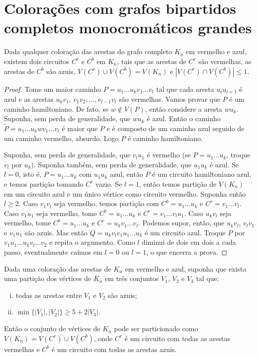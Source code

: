 \section{Colorações com grafos bipartidos completos monocromáticos grandes}

\begin{lema}
	\label{lema:gyarfas}
	Dada qualquer coloração das arestas do grafo completo $K_n$ em vermelho e azul, existem dois circuitos $C^r$ e $C^b$ em $K_n$, tais que as arestas de $C^r$ são vermelhas, as arestas de $C^b$ são azuis, $V(C^r)\cup V(C^b) = V(K_n)$ e $|V(C^r)\cap V(C^b)|\leq1$.
\end{lema}

\begin{proof}
	Tome um maior caminho $P = u_1\dots u_kv_1\dots v_l$ tal que cada aresta $u_iu_{i+1}$ é azul e as arestas $u_kv_1$, $v_1v_2, \dots, v_{l-1}v_l$ são vermelhas. Vamos provar que $P$ é um caminho hamiltoniano. De fato, se $w\notin V(P)$, então considere a aresta $wu_k$. Suponha, sem perda de generalidade, que $wu_k$ é azul. Então o caminho $\tilde{P} = u_1\dots u_k w v_1\dots v_l$ é maior que $P$ e é composto de um caminho azul seguido de um caminho vermelho, absurdo. Logo $P$ é caminho hamiltoniano. 
	
	Suponha, sem perda de generalidade, que $v_lu_1$ é vermelho (se $P = u_1\dots u_k$, troque $v_l$ por $u_k$). Suponha também, sem perda de generalidade, que $u_1u_k$ é azul. Se $l=0$, isto é, $P=u_1\dots u_k$ com $u_1u_k$ azul, então $P$ é um circuito hamiltoniano azul, e temos partição tomando $C^r$ vazio. Se $l=1$, então temos partição de $V(K_n)$ em um circuito azul e um único vértice como circuito vermelho. Suponha então $l\geq2$. Caso $v_1v_l$ seja vermelho, temos partição com $C^b = u_1\dots u_k$ e $C^r = v_1\dots v_l$. Caso $v_1u_1$ seja vermelho, tome $C^b = u_1\dots u_k$ e $C^r = v_1\dots v_lu_1$. Caso $u_kv_l$ seja vermelho, tome $C^b = u_1\dots u_k$ e $C^r = u_kv_1\dots v_l$. Podemos supor, então, que $u_kv_l$, $v_lv_1$ e $v_1u_1$ são azuis. Mas então $Q = u_kv_lv_1u_1\dots u_k$ é um circuito azul. Troque $P$ por $v_1u_1\dots u_kv_l\dots v_2$ e repita o argumento. Como $l$ diminui de dois em dois a cada passo, eventualmente caímos em $l=0$ ou $l=1$, o que encerra a prova.
\end{proof}

\begin{lema}
	\label{lema:bipartido_azul}
	Dada uma coloração das arestas de $K_n$ em vermelho e azul, suponha que exista uma partição dos vértices de $K_n$ em três conjuntos $V_1$, $V_2$ e $V_3$ tal que:
	\begin{enumerate}[(i)]
		\item todas as arestas entre $V_1$ e $V_2$ são azuis;
		\item $\min\{|V_1|, |V_2|\}\geq 5 + 2|V_3|$.
	\end{enumerate}
	Então o conjunto de vértices de $K_n$ pode ser particionado como $V(K_n) = V(C^r)\cup V(C^b)$, onde $C^r$ é um circuito com todas as arestas vermelhas e $C^b$ é um circuito com todas as arestas azuis.
\end{lema}

